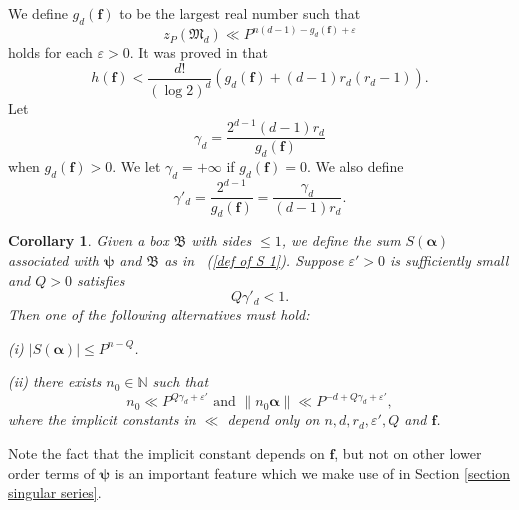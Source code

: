 \documentclass[12pt]{amsart}
\newtheorem{cor}[thm]{Corollary}
\theoremstyle{definition}
\theoremstyle{remark}
\numberwithin{equation}{section}
\begin{document}
We define $g_d( \mathbf{f} )$
to be the largest real number such that
\begin{equation}
\label{def gd}
z_P(\mathfrak{M}_d) \ll P^{n(d-1) - g_d( \mathbf{f} ) + \varepsilon}
\end{equation}
holds for each $\varepsilon >0$. It was proved in \cite[pp. 280, Corollary]{S} that
\begin{equation}
\label{h and g}
h(\mathbf{f}) < \frac{d!}{  (\log 2)^{d} }  \left( g_d( \mathbf{f} ) + (d-1)r_d (r_d - 1)  \right).
\end{equation}
Let
$$
\gamma_d = \frac{2^{d-1} (d-1) r_d}{ g_d( \mathbf{f} ) }
$$
when $g_d( \mathbf{f} ) > 0$.
We let $\gamma_d = + \infty$ if $g_d( \mathbf{f} ) = 0$.
We also define
\begin{equation}
\label{def gamma'}
\gamma'_d = \frac{ 2^{d-1} }{ g_d( \mathbf{f} ) } = \frac{ \gamma_d }{ (d-1) r_d }.
\end{equation}
\begin{cor}\cite[pp.276, Corollary]{S}
\label{cor 15.1 in S}
Given a box $\mathfrak{B}$ with sides $\leq 1$, we define the sum  $S( \boldsymbol{\alpha}) $ associated with $\boldsymbol{\psi}$ and $\mathfrak{B}$ as in ~(\ref{def of S 1}).
Suppose $\varepsilon' > 0$ is sufficiently small and $Q>0$ satisfies
$$
Q \gamma'_d < 1.
$$
Then one of the following alternatives must hold:

(i) $|  S( \boldsymbol{\alpha})  | \leq P^{n-Q}$.

(ii) there exists $n_0 \in \mathbb{N}$ such that
$$
n_0 \ll P^{Q \gamma_d + \varepsilon'} \text{  and  } \|  n_0 \boldsymbol{\alpha} \| \ll P^{ -d + Q \gamma_d + \varepsilon'},
$$
where the implicit constants in $\ll$ depend only on $n, d, r_d, \varepsilon', Q$ and $\mathbf{f}$.
\end{cor}
Note the fact that the implicit constant depends on $\mathbf{f}$, but not
on other lower order terms of $\boldsymbol{\psi}$ is an important feature which
we make use of in Section \ref{section singular series}.
\end{document}
